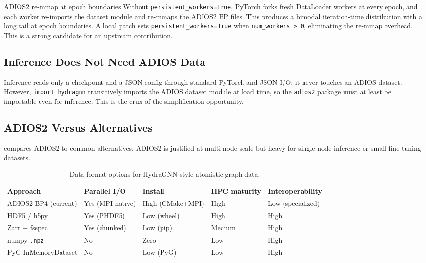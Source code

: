 \documentclass[11pt]{article}
\newcommand{\code}[1]{\texttt{#1}}
\begin{document}
\begin{lesson}{ADIOS2 re-mmap at epoch boundaries}
Without \code{persistent\_workers=True}, PyTorch forks fresh DataLoader workers at
every epoch, and each worker re-imports the dataset module and re-mmaps the ADIOS2
BP files. This produces a bimodal iteration-time distribution with a long tail at
epoch boundaries. A local patch sets \code{persistent\_workers=True} when
\code{num\_workers > 0}, eliminating the re-mmap overhead. This is a strong
candidate for an upstream contribution.
\end{lesson}

\subsection{Inference Does Not Need ADIOS Data}
Inference reads only a checkpoint and a JSON config through standard PyTorch and
JSON I/O; it never touches an ADIOS dataset. However, \code{import hydragnn}
transitively imports the ADIOS dataset module at load time, so the \code{adios2}
package must at least be importable even for inference. This is the crux of the
simplification opportunity.

\subsection{ADIOS2 Versus Alternatives}
 compares ADIOS2 to common alternatives. ADIOS2 is justified at
multi-node scale but heavy for single-node inference or small fine-tuning datasets.

\begin{table}[ht]
\centering
\footnotesize
\caption{Data-format options for HydraGNN-style atomistic graph data.}
\label{tab:adios}
\begin{tabular}{@{}p{3.4cm}p{2.4cm}p{2.6cm}p{2.4cm}p{2.6cm}@{}}
\toprule
\textbf{Approach} & \textbf{Parallel I/O} & \textbf{Install} & \textbf{HPC maturity} & \textbf{Interoperability} \\
\midrule
ADIOS2 BP4 (current) & Yes (MPI-native) & High (CMake+MPI) & High & Low (specialized) \\
HDF5 / h5py & Yes (PHDF5) & Low (wheel) & High & High \\
Zarr + fsspec & Yes (chunked) & Low (pip) & Medium & High \\
numpy \code{.npz} & No & Zero & Low & High \\
PyG InMemoryDataset & No & Low (PyG) & Low & High \\
\bottomrule
\end{tabular}
\end{table}
\end{document}
